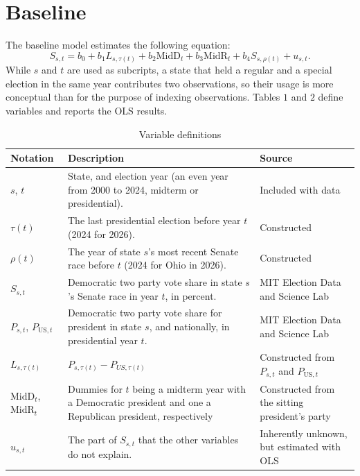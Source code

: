 \documentclass{article}
\theoremstyle{definition}
\begin{document}
\section*{Baseline}

The baseline model estimates the following equation:
\[S_{s,t} = b_0 + b_1 L_{s, \tau (t)} + b_2\text{MidD}_t + b_3\text{MidR}_t + b_4 S_{s,\rho(t)} + u_{s, t}.\]
While $s$ and $t$ are used as subcripts, a state that held a regular and a special election in the same year contributes two observations, so their usage is more conceptual than for the purpose of indexing observations. Tables $1$ and $2$ define variables and reports the OLS results. 

\begin{table}[!htbp]
  \centering
  \scriptsize
  \renewcommand{\arraystretch}{1.05}
  \caption{Variable definitions}
  \label{tab:vars}
  \setlength{\tabcolsep}{4pt}
  \begin{tabular}{l >{\raggedright\arraybackslash}p{7.6cm} >{\raggedright\arraybackslash}p{4.5cm}}
    \toprule
    Notation & Description & Source \\
    \midrule
    $s$, $t$ & State, and election year (an even year from 2000 to 2024, midterm or presidential). & Included with data \\
     $\tau(t)$ & The last presidential election before year $t$ (2024 for 2026). & Constructed \\
     $\rho(t)$ & The year of state $s$'s most recent Senate race before $t$ (2024 for Ohio in 2026). & Constructed  \\
    $S_{s,t}$ & Democratic two party vote share in state $s$'s Senate race in year $t$, in percent. & MIT Election Data and Science Lab \\
    $P_{s,t}$, $P_{\text{US},t}$ & Democratic two party vote share for president in state $s$, and nationally, in presidential year $t$. & MIT Election Data and Science Lab\\
    $L_{s,\tau(t)}$ & $P_{s,\tau(t)} - P_{US,\tau(t)}$ & Constructed from $P_{s,t}$ and $P_{\text{US},t}$ \\
    $\text{MidD}_t$, $\text{MidR}_t$ & Dummies for $t$ being a midterm year with a Democratic president and one a Republican president, respectively & Constructed from the sitting president's party \\
    $u_{s,t}$ & The part of $S_{s,t}$ that the other variables do not explain. & Inherently unknown, but estimated with OLS \\
    \bottomrule
  \end{tabular}
\end{table}
\end{document}
